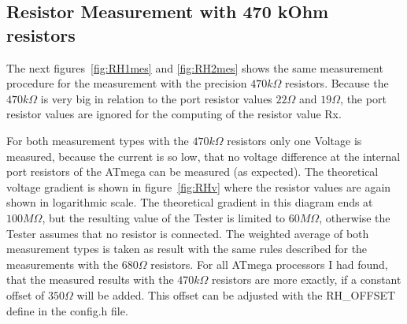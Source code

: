 \subsection{Resistor Measurement with 470 kOhm resistors}
The next figures~\ref{fig:RH1mes} and \ref{fig:RH2mes} shows the same measurement procedure for the
measurement with the precision \(470k\Omega\) resistors. Because the \(470k\Omega\) is very big in relation
to the port resistor values \(22\Omega\) and \(19\Omega\), the port resistor values are ignored for the computing
of the resistor value Rx.

For both measurement types with the \(470k\Omega\) resistors only one Voltage is measured, because the current
is so low, that no voltage difference at the internal port resistors of the ATmega can be measured (as expected).
The theoretical voltage gradient is shown in figure~\ref{fig:RHv} where the resistor values are again shown in logarithmic scale.
The theoretical gradient in this diagram ends at \(100M\Omega\), but the resulting value of the Tester is
limited to \(60M\Omega\), otherwise the Tester assumes that no resistor is connected.
The weighted average of both measurement types is taken as result with the same rules described for the measurements with the \(680\Omega\) resistors.
For all ATmega processors I had found, that the measured results with the \(470k\Omega\) resistors are more exactly,
if a constant offset of \(350\Omega\) will be added. This offset can be adjusted with the RH\_OFFSET define in the config.h file.

